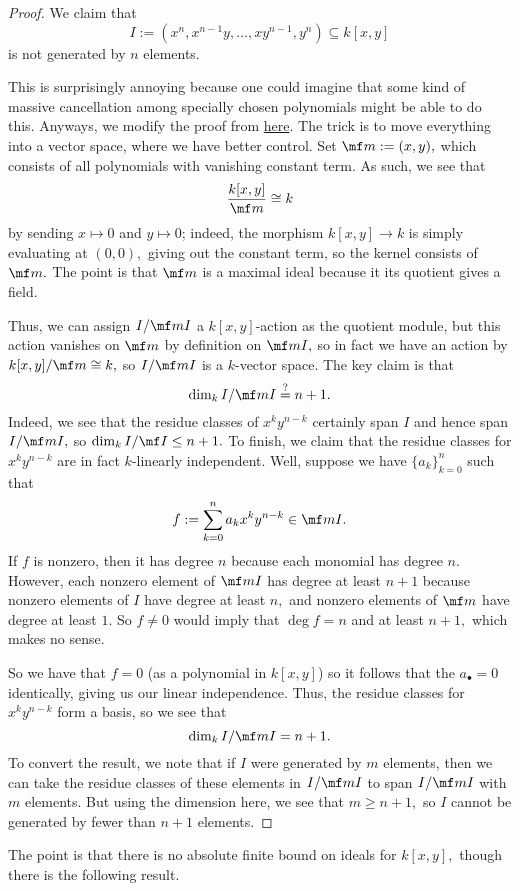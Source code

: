 \documentclass[../notes.tex]{subfiles}
\begin{document}
\begin{proof}
	We claim that
	\[I:=\left(x^n,x^{n-1}y,\ldots,xy^{n-1},y^n\right)\subseteq k[x,y]\]
	is not generated by $n$ elements.
	
	This is surprisingly annoying because one could imagine that some kind of massive cancellation among specially chosen polynomials might be able to do this. Anyways, we modify the proof from \href{https://math.stackexchange.com/a/1622173/869257}{here}. The trick is to move everything into a vector space, where we have better control. Set $\mf m:=(x,y),$ which consists of all polynomials with vanishing constant term. As such, we see that
	\[\frac{k[x,y]}{\mf m}\cong k\]
	by sending $x\mapsto0$ and $y\mapsto0$; indeed, the morphism $k[x,y]\to k$ is simply evaluating at $(0,0),$ giving out the constant term, so the kernel consists of $\mf m.$ The point is that $\mf m$ is a maximal ideal because it its quotient gives a field.

	Thus, we can assign $I/\mf mI$ a $k[x,y]$-action as the quotient module, but this action vanishes on $\mf m$ by definition on $\mf mI,$ so in fact we have an action by $k[x,y]/\mf m\cong k,$ so $I/\mf mI$ is a $k$-vector space. The key claim is that
	\[\dim_kI/\mf mI\stackrel?=n+1.\]
	Indeed, we see that the residue classes of $x^ky^{n-k}$ certainly span $I$ and hence span $I/\mf mI,$ so $\dim_kI/\mf I\le n+1.$ To finish, we claim that the residue classes for $x^ky^{n-k}$ are in fact $k$-linearly independent. Well, suppose we have $\{a_k\}_{k=0}^n$ such that
	\[f:=\sum_{k=0}^na_kx^ky^{n-k}\in\mf mI.\]
	If $f$ is nonzero, then it has degree $n$ because each monomial has degree $n.$ However, each nonzero element of $\mf mI$ has degree at least $n+1$ because nonzero elements of $I$ have degree at least $n,$ and nonzero elements of $\mf m$ have degree at least $1.$ So $f\ne0$ would imply that $\deg f=n$ and at least $n+1,$ which makes no sense.

	So we have that $f=0$ (as a polynomial in $k[x,y]$) so it follows that the $a_\bullet=0$ identically, giving us our linear independence. Thus, the residue classes for $x^ky^{n-k}$ form a basis, so we see that
	\[\dim_kI/\mf mI=n+1.\]
	To convert the result, we note that if $I$ were generated by $m$ elements, then we can take the residue classes of these elements in $I/\mf mI$ to span $I/\mf mI$ with $m$ elements. But using the dimension here, we see that $m\ge n+1,$ so $I$ cannot be generated by fewer than $n+1$ elements.
\end{proof}
The point is that there is no absolute finite bound on ideals for $k[x,y],$ though there is the following result.
\end{document}

